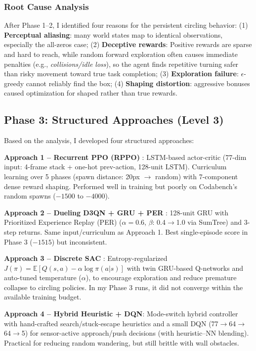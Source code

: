\documentclass[10.5pt, oneside]{article}
\begin{document}
\subsubsection{Root Cause Analysis}

After Phase 1--2, I identified four reasons for the persistent circling behavior: (1) \textbf{Perceptual aliasing}: many world states map to identical observations, especially the all-zeros case; (2) \textbf{Deceptive rewards}: Positive rewards are sparse and hard to reach, while random forward exploration often causes immediate penalties (e.g., \textit{collisions/idle loss}), so the agent finds repetitive turning safer than risky movement toward true task completion; (3) \textbf{Exploration failure}: $\epsilon$-greedy cannot reliably find the box; (4) \textbf{Shaping distortion}: aggressive bonuses caused optimization for shaped rather than true rewards.

\subsection{Phase 3: Structured Approaches (Level 3)}

Based on the analysis, I developed four structured approaches:

\textbf{Approach 1 -- Recurrent PPO (RPPO)} \cite{schulman2017proximal}: LSTM-based actor-critic (77-dim input: 4-frame stack + one-hot prev-action, 128-unit LSTM). Curriculum learning over 5 phases (spawn distance: 20px $\to$ random) with 7-component dense reward shaping. Performed well in training but poorly on Codabench's random spawns ($-1500$ to $-4000$).

\textbf{Approach 2 -- Dueling D3QN + GRU + PER} \cite{wang2016dueling, van2016deep, schaul2015prioritized}: 128-unit GRU with Prioritized Experience Replay (PER) ($\alpha\!=\!0.6$, $\beta$: 0.4$\to$1.0 via SumTree) and 3-step returns. Same input/curriculum as Approach 1. Best single-episode score in Phase 3 ($-1515$) but inconsistent.

\textbf{Approach 3 -- Discrete SAC} \cite{haarnoja2018soft}: Entropy-regularized $J(\pi) = \mathbb{E}[Q(s,a) - \alpha \log \pi(a|s)]$ with twin GRU-based Q-networks and auto-tuned temperature ($\alpha$), to encourage exploration and reduce premature collapse to circling policies. In my Phase 3 runs, it did not converge within the available training budget.

\textbf{Approach 4 -- Hybrid Heuristic + DQN}: Mode-switch hybrid controller with hand-crafted search/stuck-escape heuristics and a small DQN (77$\to$64$\to$64$\to$5) for sensor-active approach/push decisions (with heuristic--NN blending). Practical for reducing random wandering, but still brittle with wall obstacles.
\end{document}
